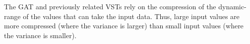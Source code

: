 The \gls{GAT} and previously related \glspl{VST} rely on the
compression of the dynamic-range of the values that can take the input
data. Thus, large input values are more compressed (where the variance
is larger) than small input values (where the variance is smaller).

